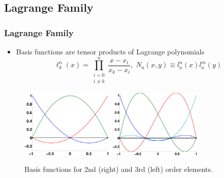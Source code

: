 \documentclass[serif,12pt]{beamer}
\begin{document}
\subsection{Lagrange Family}
\begin{frame}
\frametitle{Lagrange Family}
	\begin{itemize}
		\item Basis functions are tensor products of Lagrange polynomials
		\[ \ell^n_k(x) = \prod^n_{\begin{smallmatrix}i=0 \\ i\neq k\end{smallmatrix}} \frac{x-x_i}{x_k - x_i}, \;
		 N_a(x,y) \equiv l^n_a(x) l^m_a(y) \]
	\end{itemize}
	\begin{figure}
    \includegraphics[width=0.4\textwidth]{figures/lagrange3.pdf}
    \includegraphics[width=0.4\textwidth]{figures/lagrange4.pdf}
    \caption{Basis functions for 2nd (right) and 3rd (left) order elements.}
  \end{figure}
\end{frame}
\end{document}
